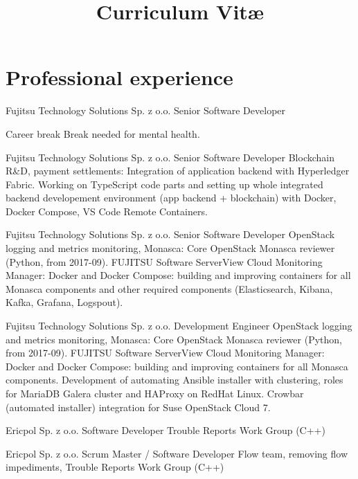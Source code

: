 \documentclass[11pt,a4paper,sans,english]{moderncv}   %
\title{Curriculum Vit\ae{}}
\begin{document}
\makecvtitle

\vspace{-1.6cm}

\section{Professional experience}

	{Fujitsu Technology Solutions Sp. z o.o.}{}{}
	{Senior Software Developer}
	{
	}

	{Career break}{}{}
	{}
	{Break needed for mental health.}

	{Fujitsu Technology Solutions Sp. z o.o.}{}{}
	{Senior Software Developer}
	{Blockchain R\&D, payment settlements: Integration of application backend
	with Hyperledger Fabric. Working on TypeScript code parts and setting up whole integrated
	backend developement environment (app backend + blockchain) with Docker, Docker Compose,
	VS Code Remote Containers.
	}

	{Fujitsu Technology Solutions Sp. z o.o.}{}{}
	{Senior Software Developer}
	{OpenStack logging and metrics monitoring, Monasca:
	Core OpenStack Monasca reviewer (Python, from 2017-09).
	FUJITSU Software ServerView Cloud Monitoring Manager:
	Docker and Docker Compose: building and improving containers for all Monasca components
	and other required components (Elasticsearch, Kibana, Kafka, Grafana, Logspout).
	}

	{Fujitsu Technology Solutions Sp. z o.o.}{}{}
	{Development Engineer}
	{OpenStack logging and metrics monitoring, Monasca:
	Core OpenStack Monasca reviewer (Python, from 2017-09).
	FUJITSU Software ServerView Cloud Monitoring Manager:
	Docker and Docker Compose: building and improving containers for all Monasca components.
	Development of automating Ansible installer with clustering, roles for MariaDB Galera cluster
	and HAProxy on RedHat Linux. Crowbar (automated installer) integration for Suse OpenStack
	Cloud 7.
	}

	{Ericpol Sp. z o.o.}{}{}
	{Software Developer}
	{Trouble Reports Work Group (C++)}

	{Ericpol Sp. z o.o.}{}{}
	{Scrum Master / Software Developer}
	{Flow team, removing flow impediments, Trouble Reports Work Group (C++)}
\end{document}
